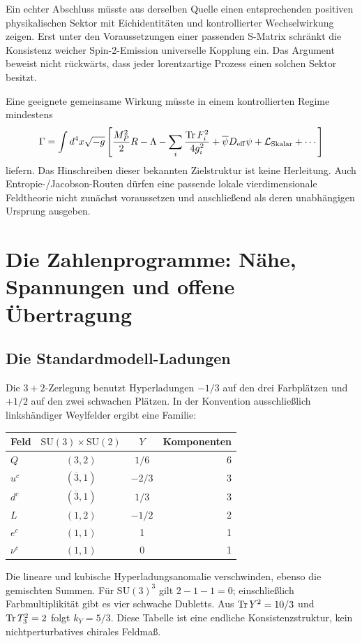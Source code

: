 Ein echter Abschluss müsste aus derselben Quelle einen entsprechenden positiven physikalischen Sektor mit Eichidentitäten und kontrollierter Wechselwirkung zeigen. Erst unter den Voraussetzungen einer passenden S-Matrix schränkt die Konsistenz weicher Spin-2-Emission universelle Kopplung ein. Das Argument beweist nicht rückwärts, dass jeder lorentzartige Prozess einen solchen Sektor besitzt.

Eine geeignete gemeinsame Wirkung müsste in einem kontrollierten Regime mindestens
\begin{equation}
\Gamma=\int d^4x\sqrt{-g}\left[
\frac{M_P^2}{2}R-\Lambda-\sum_i\frac{\operatorname{Tr} F_i^2}{4g_i^2}
+\overline\psi D_{\mathrm{eff}}\psi+\mathcal L_{\mathrm{Skalar}}+\cdots\right]
\end{equation}
liefern. Das Hinschreiben dieser bekannten Zielstruktur ist keine Herleitung. Auch Entropie-/Jacobson-Routen dürfen eine passende lokale vierdimensionale Feldtheorie nicht zunächst voraussetzen und anschließend als deren unabhängigen Ursprung ausgeben.

\chapter{Die Zahlenprogramme: Nähe, Spannungen und offene Übertragung}
\label{ch:zahlen}
\section{Die Standardmodell-Ladungen}
Die $3+2$-Zerlegung benutzt Hyperladungen $-1/3$ auf den drei Farbplätzen und $+1/2$ auf den zwei schwachen Plätzen. In der Konvention ausschließlich linkshändiger Weylfelder ergibt eine Familie:
\begin{center}
\begin{tabular}{lccr}
\toprule Feld&$\mathrm{SU}(3)\times\mathrm{SU}(2)$&$Y$&Komponenten\\\midrule
$Q$&$(3,2)$&$1/6$&6\\
$u^c$&$(\overline3,1)$&$-2/3$&3\\
$d^c$&$(\overline3,1)$&$1/3$&3\\
$L$&$(1,2)$&$-1/2$&2\\
$e^c$&$(1,1)$&1&1\\
$\nu^c$&$(1,1)$&0&1\\\bottomrule
\end{tabular}
\end{center}
Die lineare und kubische Hyperladungsanomalie verschwinden, ebenso die gemischten Summen. Für $\mathrm{SU}(3)^3$ gilt $2-1-1=0$; einschließlich Farbmultiplikität gibt es vier schwache Dubletts. Aus $\operatorname{Tr} Y^2=10/3$ und $\operatorname{Tr} T_3^2=2$ folgt $k_Y=5/3$. Diese Tabelle ist eine endliche Konsistenzstruktur, kein nichtperturbatives chirales Feldmaß. 

